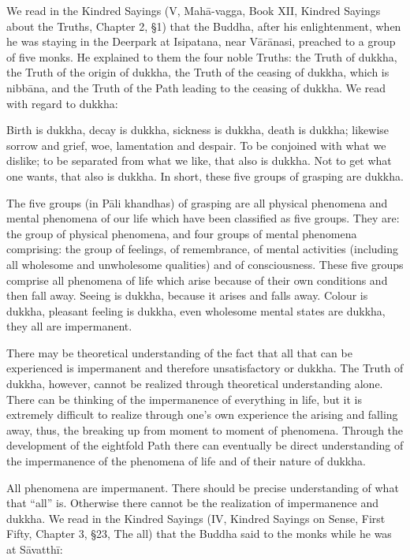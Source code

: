 \documentclass{book}
\begin{document}
We read in the Kindred Sayings (V, Mahā-vagga, Book XII, Kindred Sayings
about the Truths, Chapter 2, §1) that the Buddha, after his
enlightenment, when he was staying in the Deerpark at Isipatana, near
Vārānasi, preached to a group of five monks. He explained to them the
four noble Truths: the Truth of dukkha, the Truth of the origin of
dukkha, the Truth of the ceasing of dukkha, which is nibbāna, and the
Truth of the Path leading to the ceasing of dukkha. We read with regard
to dukkha:

Birth is dukkha, decay is dukkha, sickness is dukkha, death is dukkha;
likewise sorrow and grief, woe, lamentation and despair. To be conjoined
with what we dislike; to be separated from what we like, that also is
dukkha. Not to get what one wants, that also is dukkha. In short, these
five groups of grasping are dukkha.

The five groups (in Pāli khandhas) of grasping are all physical
phenomena and mental phenomena of our life which have been classified as
five groups. They are: the group of physical phenomena, and four groups
of mental phenomena comprising: the group of feelings, of remem­brance,
of mental activities (including all wholesome and unwholesome qualities)
and of consciousness. These five groups comprise all phenomena of life
which arise because of their own conditions and then fall away. Seeing
is dukkha, because it arises and falls away. Colour is dukkha, pleasant
feeling is dukkha, even wholesome mental states are dukkha, they all are
impermanent.

There may be theoretical understanding of the fact that all that can be
experienced is impermanent and therefore unsatisfactory or dukkha. The
Truth of dukkha, however, cannot be real­ized through theoretical
understanding alone. There can be thinking of the impermanence of
everything in life, but it is extremely difficult to realize through
one's own experience the arising and falling away, thus, the breaking up
from moment to moment of phe­nomena. Through the development of the
eightfold Path there can eventually be direct understanding of the
imper­manence of the phenomena of life and of their nature of dukkha.

All phenomena are impermanent. There should be pre­cise understanding of
what that ``all'' is. Otherwise there cannot be the realization of
impermanence and dukkha. We read in the Kindred Sayings (IV, Kindred
Sayings on Sense, First Fifty, Chapter 3, §23, The all) that the Buddha
said to the monks while he was at Sāvatthī:
\end{document}
